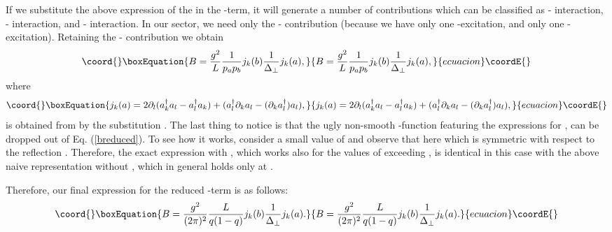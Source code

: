 \documentclass[a4paper,12pt]{article}
\begin{document}
If we substitute the above expression of the \coordHE{} in the \coordHE{}-term, 
it will generate a number of contributions which can be classified 
as \coordHE{}-\coordHE{} interaction, \coordHE{}-\coordHE{} interaction, and \coordHE{}-\coordHE{} interaction. 
In our sector, we need only the \coordHE{}-\coordHE{} 
contribution (because we have only one \coordHE{}-excitation, and only 
one \coordHE{}-excitation). Retaining the \coordHE{}-\coordHE{} contribution we obtain
\begin{equation}\coord{}\boxEquation{
\label{breduced}
B = \frac{g^2}{L}\frac{1}{p_a p_b} j_k(b)\frac{1}{\Delta_\perp}j_k(a),
}{
B = \frac{g^2}{L}\frac{1}{p_a p_b} j_k(b)\frac{1}{\Delta_\perp}j_k(a),
}{ecuacion}\coordE{}\end{equation} 
where 
\begin{equation}\coord{}\boxEquation{
\label{jreduced}
j_k(a) = 2\partial_l(a^\dagger_ka_l-a^\dagger_la_k) + 
(a^\dagger_l\partial_ka_l - (\partial_ka^\dagger_l)a_l),
}{
j_k(a) = 2\partial_l(a^\dagger_ka_l-a^\dagger_la_k) + 
(a^\dagger_l\partial_ka_l - (\partial_ka^\dagger_l)a_l),
}{ecuacion}\coordE{}\end{equation}
\coordHE{} is obtained  from \coordHE{} by the substitution \coordHE{}.
The last thing to notice is that the ugly non-smooth 
\coordHE{}-function featuring the expressions for \coordHE{}, \coordHE{} 
can be dropped out of Eq. (\ref{breduced}). To see how it works, 
consider a small value of \coordHE{} and observe that here 
\coordHE{} which is symmetric with respect 
to the reflection \coordHE{}. Therefore, 
the exact expression with \coordHE{}, which works also for 
the values of \coordHE{} exceeding \coordHE{}, is identical in this case 
with the above naive representation 
without  \coordHE{}, which in general holds only at \coordHE{}.

Therefore, our final expression for the reduced \coordHE{}-term is as follows:
\begin{equation}\coord{}\boxEquation{
\label{finalbreduced}
B=\frac{g^2}{(2\pi)^2}\frac{L}{q(1-q)}j_k(b)\frac{1}{\Delta_\perp}j_k(a).
}{
B=\frac{g^2}{(2\pi)^2}\frac{L}{q(1-q)}j_k(b)\frac{1}{\Delta_\perp}j_k(a).
}{ecuacion}\coordE{}\end{equation}
\\
\end{document}
